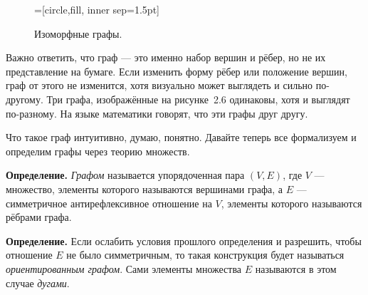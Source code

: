 \begin{figure}[h]
\centering
{}=[circle,fill, inner sep=1.5pt]
\caption{Изоморфные графы.}
\end{figure}

Важно ответить, что граф — это именно набор вершин и рёбер, но не их представление на бумаге. Если изменить форму рёбер или положение вершин, граф от этого не изменится, хотя визуально может выглядеть и сильно по-другому. Три графа, изображённые на рисунке~2.6 одинаковы, хотя и выглядят по-разному. На языке математики говорят, что эти графы  друг другу.

Что такое граф интуитивно, думаю, понятно. Давайте теперь все формализуем и определим графы через теорию множеств.

{\bfseries Определение.} {\slshape Графом} называется упорядоченная пара $(V, E)$, где $V$ — множество, элементы которого называются вершинами графа, а $E$ — симметричное антирефлексивное отношение на $V$, элементы которого называются рёбрами графа.

{\bfseries Определение.} Если ослабить условия прошлого определения и разрешить, чтобы отношение $E$ не было симметричным, то такая конструкция будет называться {\slshape ориентированным графом}. Сами элементы множества $E$ называются в этом случае {\slshape дугами}.

